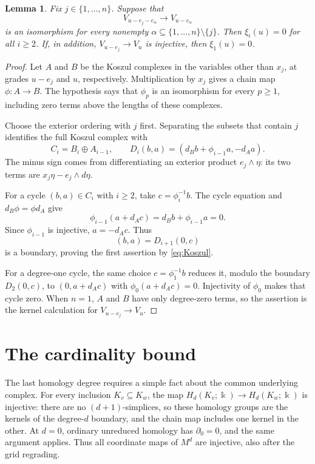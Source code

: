 \documentclass[11pt]{article}
\newtheorem{lemma}[theorem]{Lemma}
\newcommand{\kk}{\Bbbk}
\begin{document}
\begin{lemma}\label{lem:local}
Fix $j\in\{1,\ldots,n\}$. Suppose that
\begin{equation}\label{eq:off-center}
 V_{u-e_j-e_\alpha}\longrightarrow V_{u-e_\alpha}
\end{equation}
is an isomorphism for every nonempty
$\alpha\subseteq\{1,\ldots,n\}\setminus\{j\}$.
Then $\xi_i(u)=0$ for all $i\ge2$. If, in addition,
$V_{u-e_j}\to V_u$ is injective, then $\xi_1(u)=0$.
\end{lemma}

\begin{proof}
Let $A$ and $B$ be the Koszul complexes in the variables other than
$x_j$, at grades $u-e_j$ and $u$, respectively. Multiplication by $x_j$
gives a chain map $\phi:A\to B$. The hypothesis says that
$\phi_p$ is an isomorphism for every $p\ge1$, including zero terms
above the lengths of these complexes.

Choose the exterior ordering with $j$ first. Separating the subsets
that contain $j$ identifies the full Koszul complex with
\[
 C_i=B_i\oplus A_{i-1},\qquad
 D_i(b,a)=(d_Bb+\phi_{i-1}a,-d_Aa).
\]
The minus sign comes from differentiating an exterior product
$e_j\wedge\eta$: its two terms are $x_j\eta-e_j\wedge d\eta$.

For a cycle $(b,a)\in C_i$ with $i\ge2$, take
$c=\phi_i^{-1}b$. The cycle equation and $d_B\phi=\phi d_A$ give
\[
 \phi_{i-1}(a+d_Ac)=d_Bb+\phi_{i-1}a=0.
\]
Since $\phi_{i-1}$ is injective, $a=-d_Ac$. Thus
\[
 (b,a)=D_{i+1}(0,c)
\]
is a boundary, proving the first assertion by \eqref{eq:Koszul}.

For a degree-one cycle, the same choice
$c=\phi_1^{-1}b$ reduces it, modulo the boundary $D_2(0,c)$, to
$(0,a+d_Ac)$ with $\phi_0(a+d_Ac)=0$. Injectivity of $\phi_0$
makes that cycle zero. When $n=1$, $A$ and $B$ have only degree-zero
terms, so the assertion is the kernel calculation for
$V_{u-e_j}\to V_u$.
\end{proof}

\section{The cardinality bound}

The last homology degree requires a simple fact about the common
underlying complex. For every inclusion $K_v\subseteq K_w$, the map
$H_d(K_v;\kk)\to H_d(K_w;\kk)$ is injective: there are no
$(d+1)$-simplices, so these homology groups are the kernels of the
degree-$d$ boundary, and the chain map includes one kernel in the
other. At $d=0$, ordinary unreduced homology has $\partial_0=0$,
and the same argument applies. Thus all coordinate maps of $M^d$
are injective, also after the grid regrading.
\end{document}

